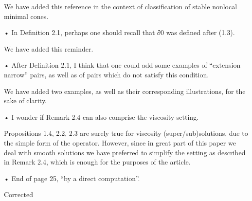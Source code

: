 We have added this reference in the context of classification of stable nonlocal minimal cones.


• In Definition 2.1, perhaps one should recall that ∂0 was defined after (1.3).

We have added this reminder.


• After Definition 2.1, I think that one could add some examples of “extension narrow” pairs, as well as of pairs which do not satisfy this condition.

We have added two examples, as well as their corresponding illustrations, for the sake of clarity.


• I wonder if Remark 2.4 can also comprise the viscosity setting.

Propositions 1.4, 2.2, 2.3 are surely true for viscosity (super/sub)solutions, due to the simple form of the operator. However, since in great part of this paper we deal with smooth solutions we have preferred to simplify the setting as described in  Remark 2.4, which is enough for the purposes of the article. 

• End of page 25, “by a direct computation”.

Corrected

